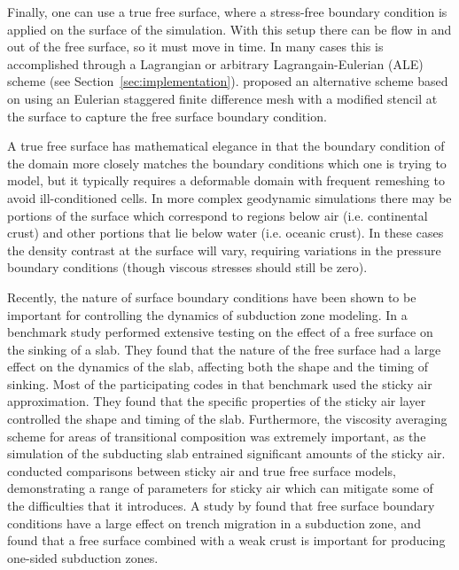 \documentclass[preprint,12pt,authoryear]{elsarticle}
\begin{document}
Finally, one can use a true free surface, where a stress-free boundary condition is applied on the surface of the simulation. 
With this setup there can be flow in and out of the free surface, so it must move in time.
In many cases this is accomplished through a Lagrangian or arbitrary Lagrangain-Eulerian (ALE) scheme (see Section~\ref{sec:implementation}).
\citet{duretz2016free} proposed an alternative scheme based on using an Eulerian staggered finite difference mesh
with a modified stencil at the surface to capture the free surface boundary condition.

A true free surface has mathematical elegance in that the boundary condition of the domain more closely 
matches the boundary conditions which one is trying to model, but it typically requires a deformable 
domain with frequent remeshing to avoid ill-conditioned cells. 
In more complex geodynamic simulations there may be portions of the surface which
correspond to regions below air (i.e. continental crust) and other portions that lie below water (i.e. oceanic crust).
In these cases the density contrast at the surface will vary, requiring variations
in the pressure boundary conditions (though viscous stresses should still be zero).

Recently, the nature of surface boundary conditions have been shown to be important for controlling the 
dynamics of subduction zone modeling.  In a benchmark study \citet{schmeling2008benchmark} performed extensive testing on the effect
of a free surface on the sinking of a slab. They found that the nature of the free surface had a large effect 
on the dynamics of the slab, affecting both the shape and the timing of sinking. Most of the 
participating codes in that benchmark used the sticky air approximation.
They found that the specific properties of the sticky air layer controlled the shape and timing of the slab.
Furthermore, the viscosity averaging scheme for areas of transitional
composition was extremely important, as the simulation of the subducting slab entrained significant amounts of the sticky air.
\citet{crameri2012comparison} conducted comparisons between sticky air and true free surface models, 
demonstrating a range of parameters for sticky air which can mitigate some of the difficulties that it introduces.
A study by \citet{quinquis2011role} found that free surface boundary conditions have a large effect on 
trench migration in a subduction zone, and \citet{crameri2012free} found that a free surface combined 
with a weak crust is important for producing one-sided subduction zones.
\end{document}
